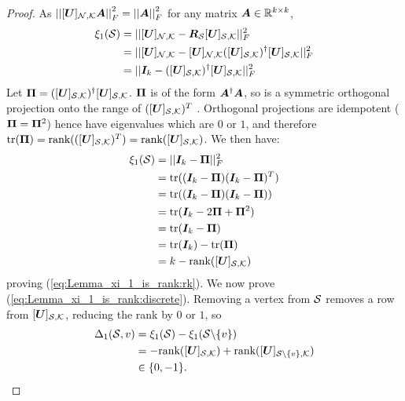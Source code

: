 \begin{proof}
As $\sqfrob{\matrsubU{N}\matr{A}} = \sqfrob{\matr{A}}$ for any matrix $\bm{A}\in \mathbb{R}^{k \times k}$, 
    \begin{align}
        \xi_{1}(\set{S}) &= || \matrsubU{N} - \matr{R}_{\set{S}}[\matr{U}]_{\set{S},\set{K}} ||^{2}_{F} \\
        &= || \matrsubU{N} - \matrsubU{N}([\matr{U}]_{\set{S},\set{K}})^{\dagger}[\matr{U}]_{\set{S},\set{K}} ||^{2}_{F} \\
        &= || \matr{I}_{k} -([\matr{U}]_{\set{S},\set{K}})^{\dagger}[\matr{U}]_{\set{S},\set{K}}||^{2}_{F}
    \end{align}
    Let $\bm{\Pi} = ([\bm{U}]_{\mathcal{S},\mathcal{K}})^{\dagger}[\bm{U}]_{\mathcal{S},\mathcal{K}}$. $\bm{\Pi}$ is of the form $\bm{A}^{\dagger}\bm{A}$, so is a symmetric orthogonal projection onto the range of $([\bm{U}]_{\mathcal{S},\mathcal{K}})^{T}$ \cite[p.~290]{golub13}. Orthogonal projections are idempotent ($\bm{\Pi} = \bm{\Pi}^{2}$) hence have eigenvalues which are $0$ or $1$, and therefore $\text{tr}(\bm{\Pi}) = \text{rank}(([\bm{U}]_{\mathcal{S},\mathcal{K}})^{T}) = \text{rank}([\bm{U}]_{\mathcal{S},\mathcal{K}})$. We then have:
    \begin{align}
        \xi_{1}(\mathcal{S}) &= ||\bm{I}_{k} - \bm{\Pi}||^{2}_{F} \\
        &= \text{tr}((\bm{I}_{k} - \bm{\Pi})(\bm{I}_{k} - \bm{\Pi})^{T})\\
        & =\text{tr}((\bm{I}_{k} - \bm{\Pi})(\bm{I}_{k} - \bm{\Pi})) \\
        &= \text{tr}(\bm{I}_{k} - 2\bm{\Pi} + \bm{\Pi}^{2}) \\
        &= \text{tr}(\bm{I}_{k} - \bm{\Pi}) \\
        &= \text{tr}(\bm{I}_{k}) - \text{tr}(\bm{\Pi}) \\
        &= k - \text{rank}([\bm{U}]_{\mathcal{S},\mathcal{K}})
    \end{align}
    proving (\ref{eq:Lemma_xi_1_is_rank:rk}). We now prove (\ref{eq:Lemma_xi_1_is_rank:discrete}). Removing a vertex from $\mathcal{S}$ removes a row from $[\bm{U}]_{\mathcal{S},\mathcal{K}}$, reducing the rank by $0$ or $1$, so 
\begin{align}
\Delta_{1}(\mathcal{S},v) &= \xi_{1}(\mathcal{S}) - \xi_{1}(\mathcal{S} \backslash \{v\})  \\
&= - \text{rank}([\bm{U}]_{\mathcal{S},\mathcal{K}}) + \text{rank}([\bm{U}]_{\mathcal{S} \backslash \{v\}, \mathcal{K}})  \\
&\in \{0, -1\}. 
\end{align} 
\end{proof}

